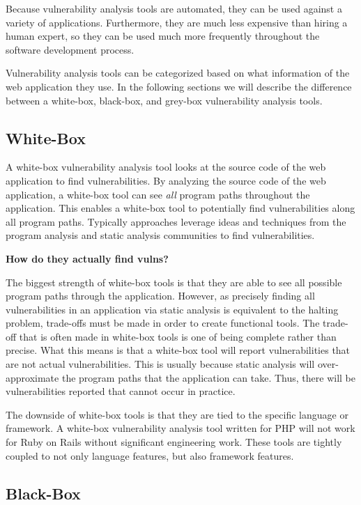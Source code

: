 Because vulnerability analysis tools are automated, they can be used
against a variety of applications. Furthermore, they are much less
expensive than hiring a human expert, so they can be used much more
frequently throughout the software development process.

Vulnerability analysis tools can be categorized based on what
information of the web application they use. In the following
sections we will describe the difference between a white-box,
black-box, and grey-box vulnerability analysis tools. 

\subsection{White-Box}

A white-box vulnerability analysis tool looks at the source code of
the web application to find vulnerabilities. By analyzing the source
code of the web application, a white-box tool can see \emph{all}
program paths throughout the application. This enables a white-box
tool to potentially find vulnerabilities along all program paths.
Typically approaches leverage ideas and techniques from the program
analysis and static analysis communities to find vulnerabilities.

\textbf{How do they actually find vulns?}

The biggest strength of white-box tools is that they are able to see
all possible program paths through the application. However, as
precisely finding all vulnerabilities in an application via static
analysis is equivalent to the halting problem, trade-offs must be made
in order to create functional tools. The trade-off that is often made
in white-box tools is one of being complete rather than precise. What
this means is that a white-box tool will report vulnerabilities that
are not actual vulnerabilities. This is usually because static
analysis will over-approximate the program paths that the application
can take. Thus, there will be vulnerabilities reported that cannot
occur in practice. 

The downside of white-box tools is that they are tied to the specific
language or framework. A white-box vulnerability analysis tool written
for PHP will not work for Ruby on Rails without significant
engineering work. These tools are tightly coupled to not only language
features, but also framework features. 

\subsection{Black-Box}

